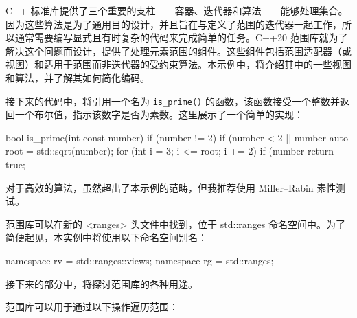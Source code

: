 
C++ 标准库提供了三个重要的支柱——容器、迭代器和算法——能够处理集合。因为这些算法是为了通用目的设计，并且旨在与定义了范围的迭代器一起工作，所以通常需要编写显式且有时复杂的代码来完成简单的任务。C++20 范围库就为了解决这个问题而设计，提供了处理元素范围的组件。这些组件包括范围适配器（或视图）和适用于范围而非迭代器的受约束算法。本示例中，将介绍其中的一些视图和算法，并了解其如何简化编码。


接下来的代码中，将引用一个名为 \verb|is_prime()| 的函数，该函数接受一个整数并返回一个布尔值，指示该数字是否为素数。这里展示了一个简单的实现：

\begin{cpp}
bool is_prime(int const number)
{
    if (number != 2)
    {
        if (number < 2 || number %
        auto root = std::sqrt(number);
        for (int i = 3; i <= root; i += 2)
        if (number %
    }
    return true;
}
\end{cpp}

\begin{myNotic}
对于高效的算法，虽然超出了本示例的范畴，但我推荐使用 Miller–Rabin 素性测试。
\end{myNotic}

范围库可以在新的 <ranges> 头文件中找到，位于 std::ranges 命名空间中。为了简便起见，本实例中将使用以下命名空间别名：

\begin{cpp}
namespace rv = std::ranges::views;
namespace rg = std::ranges;
\end{cpp}

接下来的部分中，将探讨范围库的各种用途。


范围库可以用于通过以下操作遍历范围：

